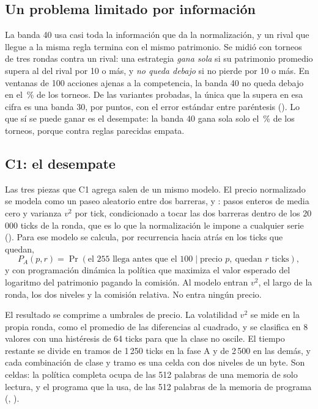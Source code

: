 \subsection{Un problema limitado por información}

La banda 40 usa casi toda la información que da la normalización, y un rival que llegue a la misma regla termina con el mismo patrimonio. Se midió con torneos de tres rondas contra un rival: una estrategia \emph{gana sola} si su patrimonio promedio supera al del rival por 10 o más, y \emph{no queda debajo} si no pierde por 10 o más. En \ctresAjenasVentanas{} ventanas de 100 acciones ajenas a la competencia, la banda 40 no queda debajo en el \ctresAjenasNdBanda\,\% de los torneos. De las variantes probadas, la única que la supera en esa cifra es una banda 30, por \ctresAjenasDifNdBandaTreinta{} puntos, con el error estándar entre paréntesis (). Lo que sí se puede ganar es el desempate: la banda 40 gana sola solo el \ctresAjenasGanaBanda\,\% de los torneos, porque contra reglas parecidas empata.

\subsection{C1: el desempate}

Las tres piezas que C1 agrega salen de un mismo modelo. El precio normalizado se modela como un paseo aleatorio entre dos barreras, \cifraPrecioMin{} y \cifraPrecioMax: pasos enteros de media cero y varianza $v^2$ por tick, condicionado a tocar las dos barreras dentro de los 20\,000 ticks de la ronda, que es lo que la normalización le impone a cualquier serie (). Para ese modelo se calcula, por recurrencia hacia atrás en los ticks que quedan,
\[ P_A(p, r) = \Pr(\text{el 255 llega antes que el 100} \mid \text{precio } p,\ \text{quedan } r \text{ ticks}), \]
y con programación dinámica la política que maximiza el valor esperado del logaritmo del patrimonio pagando la comisión. Al modelo entran $v^2$, el largo de la ronda, los dos niveles y la comisión relativa. No entra ningún precio.

El resultado se comprime a umbrales de precio. La volatilidad $v^2$ se mide en la propia ronda, como el promedio de las diferencias al cuadrado, y se clasifica en 8 valores con una histéresis de 64 ticks para que la clase no oscile. El tiempo restante se divide en tramos de 1\,250 ticks en la fase A y de 2\,500 en las demás, y cada combinación de clase y tramo es una celda con dos niveles de un byte. Son \ctresTablaCeldas{} celdas: la política completa ocupa \ctresTablaUsadas{} de las 512 palabras de una memoria de solo lectura, y el programa que la usa, \ctresPalabras{} de las 512 palabras de la memoria de programa (, ).

